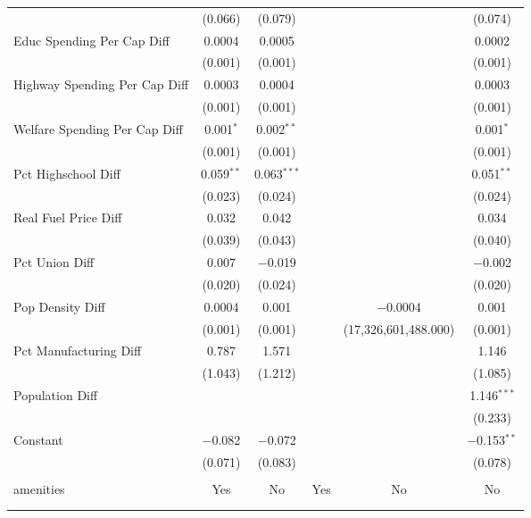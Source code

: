 \begin{table}[!htbp]
\begin{tabular}{@{\extracolsep{5pt}}lccccc}
  & (0.066) & (0.079) &  &  & (0.074) \\ 
  Educ Spending Per Cap Diff & 0.0004 & 0.0005 &  &  & 0.0002 \\ 
  & (0.001) & (0.001) &  &  & (0.001) \\ 
  Highway Spending Per Cap Diff & 0.0003 & 0.0004 &  &  & 0.0003 \\ 
  & (0.001) & (0.001) &  &  & (0.001) \\ 
  Welfare Spending Per Cap Diff & 0.001$^{*}$ & 0.002$^{**}$ &  &  & 0.001$^{*}$ \\ 
  & (0.001) & (0.001) &  &  & (0.001) \\ 
  Pct Highschool Diff & 0.059$^{**}$ & 0.063$^{***}$ &  &  & 0.051$^{**}$ \\ 
  & (0.023) & (0.024) &  &  & (0.024) \\ 
  Real Fuel Price Diff & 0.032 & 0.042 &  &  & 0.034 \\ 
  & (0.039) & (0.043) &  &  & (0.040) \\ 
  Pct Union Diff & 0.007 & $-$0.019 &  &  & $-$0.002 \\ 
  & (0.020) & (0.024) &  &  & (0.020) \\ 
  Pop Density Diff & 0.0004 & 0.001 &  & $-$0.0004 & 0.001 \\ 
  & (0.001) & (0.001) &  & (17,326,601,488.000) & (0.001) \\ 
  Pct Manufacturing Diff & 0.787 & 1.571 &  &  & 1.146 \\ 
  & (1.043) & (1.212) &  &  & (1.085) \\ 
  Population Diff &  &  &  &  & 1.146$^{***}$ \\ 
  &  &  &  &  & (0.233) \\ 
  Constant & $-$0.082 & $-$0.072 &  &  & $-$0.153$^{**}$ \\ 
  & (0.071) & (0.083) &  &  & (0.078) \\ 
 \hline \\[-1.8ex] 
amenities & Yes & No & Yes & No & No \\ 
\hline \\[-1.8ex] 
\hline 
\hline \\[-1.8ex] 
\end{tabular} 
\end{table} 
